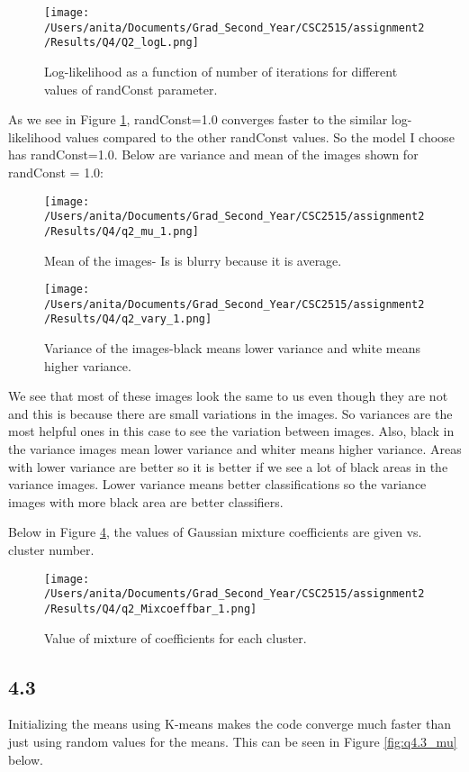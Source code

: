 \documentclass[10pt]{article}
\begin{document}
\begin{figure}[H]
	\centering
	\texttt{[image: /Users/anita/Documents/Grad\_Second\_Year/CSC2515/assignment2/Results/Q4/Q2\_logL.png]}
	\caption{Log-likelihood as a function of number of iterations for different values of randConst parameter.}
	\label{fig:q4_log_iter}
\end{figure}
As we see in Figure \ref{fig:q4_log_iter}, randConst=1.0 converges faster to the similar log-likelihood values compared to the other randConst values. So the model I choose has randConst=1.0.
Below are variance and mean of the images shown for randConst = 1.0:
\begin{figure}[H]
	\centering
	\texttt{[image: /Users/anita/Documents/Grad\_Second\_Year/CSC2515/assignment2/Results/Q4/q2\_mu\_1.png]}
	\caption{Mean of the images- Is is blurry because it is average.}
	\label{fig:q4.2_mu}
\end{figure}

\begin{figure}[H]
	\centering
	\texttt{[image: /Users/anita/Documents/Grad\_Second\_Year/CSC2515/assignment2/Results/Q4/q2\_vary\_1.png]}
	\caption{Variance of the images-black means lower variance and white means higher variance.}
	\label{fig:q4.2_vary}
\end{figure}

We see that most of these images look the same to us even though they are not and this is because there are small variations in the images. So variances are the most helpful ones in this case to see the variation between images.
Also, black in the variance images mean lower variance and whiter means higher variance. Areas with lower variance are better so it is better if we see a lot of black areas in the variance images. Lower variance means better classifications so the variance images with more black area are better classifiers.

Below in Figure \ref{fig:q4.2_pik}, the values of Gaussian mixture coefficients are given vs. cluster number.
\begin{figure}[H]
	\centering
	\texttt{[image: /Users/anita/Documents/Grad\_Second\_Year/CSC2515/assignment2/Results/Q4/q2\_Mixcoeffbar\_1.png]}
	\caption{Value of mixture of coefficients for each cluster.}
	\label{fig:q4.2_pik}
\end{figure}


\subsection*{4.3}
Initializing the means using K-means makes the code converge much faster than just using random values for the means.
This can be seen in Figure \ref{fig:q4.3_mu} below.
\end{document}

